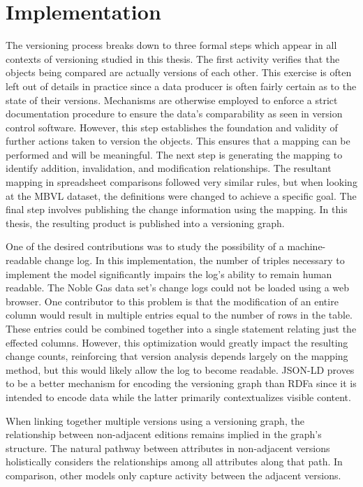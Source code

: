 \section{Implementation}

The versioning process breaks down to three formal steps which appear in all contexts of versioning studied in this thesis.
The first activity verifies that the objects being compared are actually versions of each other.
This exercise is often left out of details in practice since a data producer is often fairly certain as to the state of their versions.
Mechanisms are otherwise employed to enforce a strict documentation procedure to ensure the data's comparability as seen in version control software.
However, this step establishes the foundation and validity of further actions taken to version the objects.
This ensures that a mapping can be performed and will be meaningful.
The next step is generating the mapping to identify addition, invalidation, and modification relationships.
The resultant mapping in spreadsheet comparisons followed very similar rules, but when looking at the MBVL dataset, the definitions were changed to achieve a specific goal.
The final step involves publishing the change information using the mapping.
In this thesis, the resulting product is published into a versioning graph.

One of the desired contributions was to study the possibility of a machine-readable change log.
In this implementation, the number of triples necessary to implement the model significantly impairs the log's ability to remain human readable.
The Noble Gas data set's change logs could not be loaded using a web browser.
One contributor to this problem is that the modification of an entire column would result in multiple entries equal to the number of rows in the table.
These entries could be combined together into a single statement relating just the effected columns.
However, this optimization would greatly impact the resulting change counts, reinforcing that version analysis depends largely on the mapping method, but this would likely allow the log to become readable.
JSON-LD proves to be a better mechanism for encoding the versioning graph than RDFa since it is intended to encode data while the latter primarily contextualizes visible content.

When linking together multiple versions using a versioning graph, the relationship between non-adjacent editions remains implied in the graph's structure.
The natural pathway between attributes in non-adjacent versions holistically considers the relationships among all attributes along that path.
In comparison, other models only capture activity between the adjacent versions.

